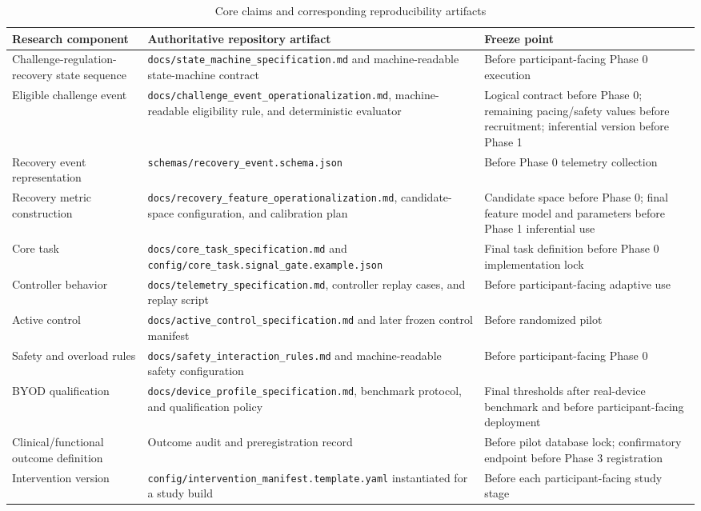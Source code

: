 \documentclass[man]{apa7}
\begin{document}
\begin{table}[htbp]
\centering
\small
\caption{Core claims and corresponding reproducibility artifacts}
\begin{tabular}{p{3.2cm}p{5.0cm}p{4.5cm}}
\toprule
Research component & Authoritative repository artifact & Freeze point \\
\midrule
Challenge-regulation-recovery state sequence & \nolinkurl{docs/state_machine_specification.md} and machine-readable state-machine contract & Before participant-facing Phase 0 execution \\
Eligible challenge event & \nolinkurl{docs/challenge_event_operationalization.md}, machine-readable eligibility rule, and deterministic evaluator & Logical contract before Phase 0; remaining pacing/safety values before recruitment; inferential version before Phase 1 \\
Recovery event representation & \nolinkurl{schemas/recovery_event.schema.json} & Before Phase 0 telemetry collection \\
Recovery metric construction & \nolinkurl{docs/recovery_feature_operationalization.md}, candidate-space configuration, and calibration plan & Candidate space before Phase 0; final feature model and parameters before Phase 1 inferential use \\
Core task & \nolinkurl{docs/core_task_specification.md} and \nolinkurl{config/core_task.signal_gate.example.json} & Final task definition before Phase 0 implementation lock \\
Controller behavior & \nolinkurl{docs/telemetry_specification.md}, controller replay cases, and replay script & Before participant-facing adaptive use \\
Active control & \nolinkurl{docs/active_control_specification.md} and later frozen control manifest & Before randomized pilot \\
Safety and overload rules & \nolinkurl{docs/safety_interaction_rules.md} and machine-readable safety configuration & Before participant-facing Phase 0 \\
BYOD qualification & \nolinkurl{docs/device_profile_specification.md}, benchmark protocol, and qualification policy & Final thresholds after real-device benchmark and before participant-facing deployment \\
Clinical/functional outcome definition & Outcome audit and preregistration record & Before pilot database lock; confirmatory endpoint before Phase 3 registration \\
Intervention version & \nolinkurl{config/intervention_manifest.template.yaml} instantiated for a study build & Before each participant-facing study stage \\
\bottomrule
\end{tabular}
\end{table}
\end{document}

